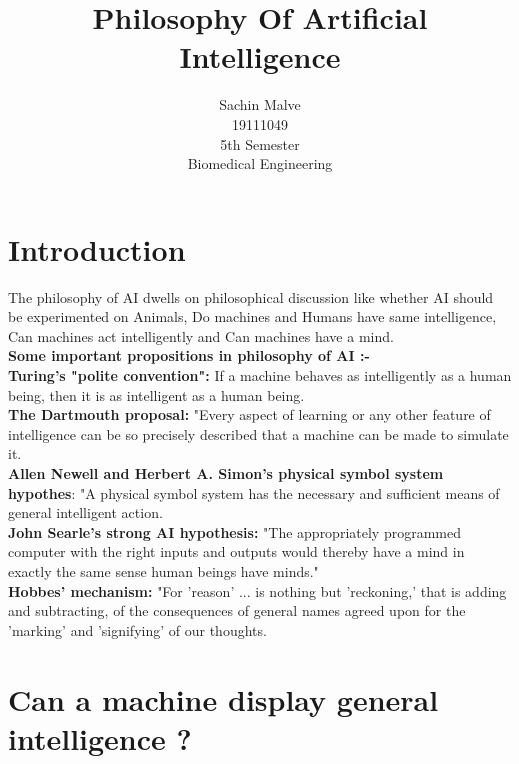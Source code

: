 \documentclass{article}
\begin{document}
\title{Philosophy Of Artificial Intelligence}


\author{Sachin Malve \\
	19111049 \\
 	5th Semester \\ 
	Biomedical Engineering\\
	}

\maketitle 
 \hrulefill

\section{Introduction}
 




The philosophy of AI dwells on philosophical discussion like whether AI should be experimented on Animals, Do machines and Humans have same intelligence, Can machines act intelligently and Can machines have a mind.\\
\textbf {Some important propositions in philosophy of AI :- }\\
\textbf {Turing's "polite convention":} If a machine behaves as intelligently as a human being, then it is as intelligent as a human being. \\
\textbf {The Dartmouth proposal:} "Every aspect of learning or any other feature of intelligence can be so precisely described that a machine can be made to simulate it. \\
\textbf {Allen Newell and Herbert A. Simon's physical symbol system hypothes}: "A physical symbol system has the necessary and sufficient means of general intelligent action.\\
\textbf  {John Searle's strong AI hypothesis:}  "The appropriately programmed computer with the right inputs and outputs would thereby have a mind in exactly the same sense human beings have minds."\\
\textbf {Hobbes' mechanism: }"For 'reason' ... is nothing but 'reckoning,' that is adding and subtracting, of the consequences of general names agreed upon for the 'marking' and 'signifying' of our thoughts. \\
 \section{Can a machine display general intelligence ?}
\end{document}
